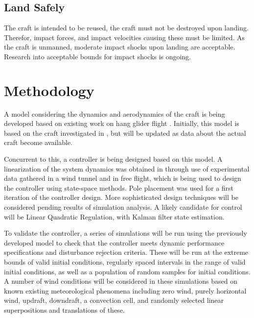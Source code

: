 \documentclass{sydeStyle}
\begin{document}
\section{Land Safely}

The craft is intended to be reused, the craft must not be destroyed
upon landing. Therefor, impact forces, and impact velocities causing these must
be limited. As the craft is unmanned, moderate impact shocks upon landing are
acceptable. Research into acceptable bounds for impact shocks is ongoing.

\chapter{Methodology}

A model considering the dynamics and aerodynamics of the craft is being
developed based on existing work on hang glider flight \cite{Rogallo1960}
\cite{Layton1963} \cite{spottiswoode}.
Initially, this model is based on the craft investigated in \cite{spottiswoode},
but will be updated as data about the actual craft become available.

Concurrent to this, a controller is being designed based on this model.
A linearization of the system dynamics was obtained in \cite{spottiswoode}
through use of experimental data gathered in a wind tunnel and in free flight,
which is being used to design the controller using state-space methods.  Pole
placement was used for a first iteration of the controller design.  More
sophisticated design techniques will be considered pending results of
simulation analysis.  A likely candidate for control will be Linear Quadratic
Regulation, with Kalman filter state estimation.

To validate the controller, a series of simulations will be run using the
previously developed model to check that the controller meets dynamic
performance specifications and disturbance rejection criteria.  These will be
run at the extreme bounds of valid initial conditions, regularly spaced
intervals in the range of valid initial conditions, as well as a population of
random samples for initial conditions.  A number of wind conditions will be
considered in these simulations based on known existing meteorological
phenomena including zero wind, purely horizontal wind, updraft, downdraft, a
convection cell, and randomly selected linear superpositions and translations
of these.
\end{document}
